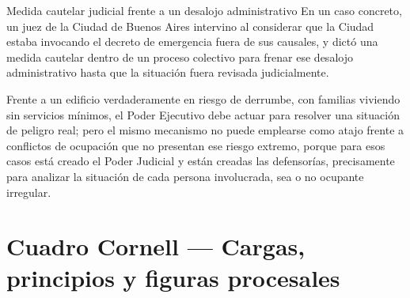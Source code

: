\documentclass[12pt,oneside]{book}
\begin{document}
\begin{example}{Medida cautelar judicial frente a un desalojo administrativo}
En un caso concreto, un juez de la Ciudad de Buenos Aires intervino al considerar que la Ciudad estaba invocando el decreto de emergencia fuera de sus causales, y dictó una medida cautelar dentro de un proceso colectivo para frenar ese desalojo administrativo hasta que la situación fuera revisada judicialmente.
\end{example}

Frente a un edificio verdaderamente en riesgo de derrumbe, con familias viviendo sin servicios mínimos, el Poder Ejecutivo debe actuar para resolver una situación de peligro real; pero el mismo mecanismo no puede emplearse como atajo frente a conflictos de ocupación que no presentan ese riesgo extremo, porque para esos casos está creado el Poder Judicial y están creadas las defensorías, precisamente para analizar la situación de cada persona involucrada, sea o no ocupante irregular.

\section*{Cuadro Cornell --- Cargas, principios y figuras procesales}
\end{document}
